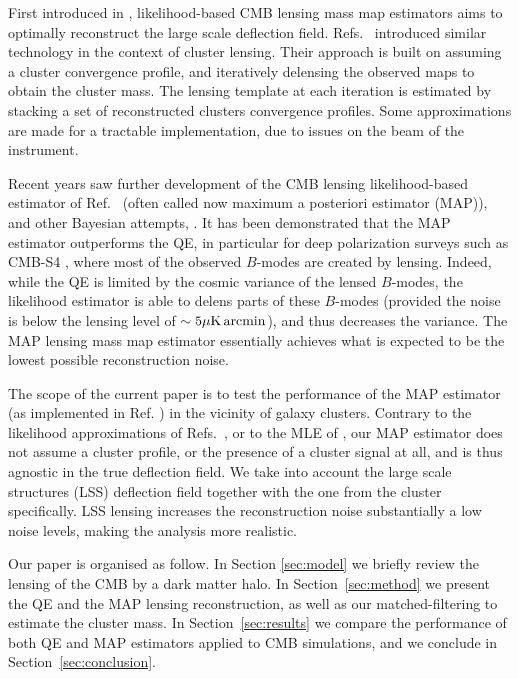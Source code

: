 \documentclass[prd, superscriptaddress, tightenlines, longbibliography, nofootinbib, eqsecnum, amsfonts, amsmath, floatfix, twocolumn, notitlepage]{revtex4-2}
\begin{document}
First introduced in \cite{Hirata:2002jy, Hirata:2003ka}, likelihood-based CMB lensing mass map estimators aims to optimally reconstruct the large scale deflection field.
Refs.~\cite{ Yoo:2008bf, Yoo:2010jd} introduced similar technology in the context of cluster lensing.
Their approach is built on assuming a cluster convergence profile, and iteratively delensing the observed maps to obtain the cluster mass. The lensing template at each iteration is estimated by stacking a set of reconstructed clusters convergence profiles. Some approximations are made for a tractable implementation, due to issues on the beam of the instrument.

Recent years saw further development of the CMB lensing likelihood-based estimator of Ref.~\cite{Hirata:2002jy, Hirata:2003ka} (often called now maximum a posteriori estimator (MAP)), and other Bayesian attempts, \cite{Carron:2017mqf,Millea:2017fyd,Millea:2020cpw, Millea:2021had,Legrand:2021qdu,Aurlien:2022tlp,Legrand:2023jne,Reinecke:2023gtp}.
It has been demonstrated that the MAP estimator outperforms the QE, in particular for deep polarization surveys such as CMB-S4 \cite{CMB-S4:2016ple}, where most of the observed $B$-modes are created by lensing. Indeed, while the QE is limited by the cosmic variance of the lensed $B$-modes, the likelihood estimator is able to delens parts of these $B$-modes (provided the noise is below the lensing level of $\sim 5\mu\rm K \, arcmin$), and thus decreases the variance. The MAP lensing mass map estimator essentially achieves what is expected to be the lowest possible reconstruction noise.

The scope of the current paper is to test the performance of the MAP estimator (as implemented in Ref. \cite{Carron:2017mqf}) in the vicinity of galaxy clusters.
Contrary to the likelihood approximations of Refs.~\cite{ Yoo:2008bf, Yoo:2010jd}, or to the MLE of \cite{Lewis:2005fq, Baxter:2014frs, Raghunathan:2017cle}, our MAP estimator does not assume a cluster profile, or the presence of a cluster signal at all, and is thus agnostic in the true deflection field. We take into account the large scale structures (LSS) deflection field together with the one from the cluster specifically. LSS lensing increases the reconstruction noise substantially a low noise levels, making the analysis more realistic.

Our paper is organised as follow. In Section \ref{sec:model} we briefly review the lensing of the CMB by a dark matter halo. In Section~\ref{sec:method} we present the QE and the MAP lensing reconstruction, as well as our matched-filtering to estimate the cluster mass. In Section~\ref{sec:results} we compare the performance of both QE and MAP estimators applied to CMB simulations, and we conclude in Section~\ref{sec:conclusion}.
\end{document}
